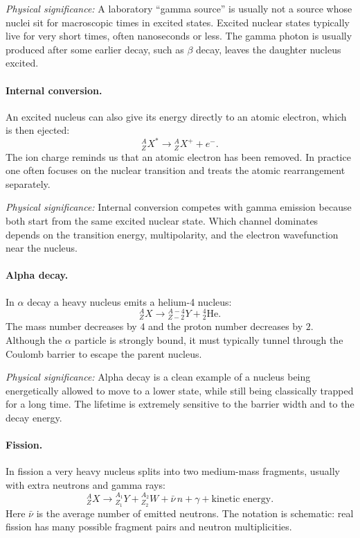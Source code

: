 \textit{Physical significance:} A laboratory ``gamma source'' is usually not a
source whose nuclei sit for macroscopic times in excited states.  Excited
nuclear states typically live for very short times, often nanoseconds or less.
The gamma photon is usually produced after some earlier decay, such as
$\beta$ decay, leaves the daughter nucleus excited.

\paragraph{Internal conversion.}
An excited nucleus can also give its energy directly to an atomic electron,
which is then ejected:
\begin{equation}
  \label{eq:lec05:internal_conversion}
  \boxed{{}^{A}_{Z}X^{*}\rightarrow{}^{A}_{Z}X^{+}+e^{-}.}
\end{equation}
The ion charge reminds us that an atomic electron has been removed.  In practice
one often focuses on the nuclear transition and treats the atomic rearrangement
separately.

\textit{Physical significance:} Internal conversion competes with gamma
emission because both start from the same excited nuclear state.  Which channel
dominates depends on the transition energy, multipolarity, and the electron
wavefunction near the nucleus.

\paragraph{Alpha decay.}
In $\alpha$ decay a heavy nucleus emits a helium-4 nucleus:
\begin{equation}
  \label{eq:lec05:alpha_decay}
  \boxed{{}^{A}_{Z}X\rightarrow{}^{A-4}_{Z-2}Y+{}^{4}_{2}\mathrm{He}.}
\end{equation}
The mass number decreases by $4$ and the proton number decreases by $2$.
Although the $\alpha$ particle is strongly bound, it must typically tunnel
through the Coulomb barrier to escape the parent nucleus.

\textit{Physical significance:} Alpha decay is a clean example of a nucleus
being energetically allowed to move to a lower state, while still being
classically trapped for a long time.  The lifetime is extremely sensitive to the
barrier width and to the decay energy.

\paragraph{Fission.}
In fission a very heavy nucleus splits into two medium-mass fragments, usually
with extra neutrons and gamma rays:
\begin{equation}
  \label{eq:lec05:fission_decay}
  \boxed{{}^{A}_{Z}X\rightarrow{}^{A_1}_{Z_1}Y
  +{}^{A_2}_{Z_2}W+\bar{\nu}\,n+\gamma+\text{kinetic energy}.}
\end{equation}
Here $\bar{\nu}$ is the average number of emitted neutrons.  The notation is
schematic: real fission has many possible fragment pairs and neutron
multiplicities.

